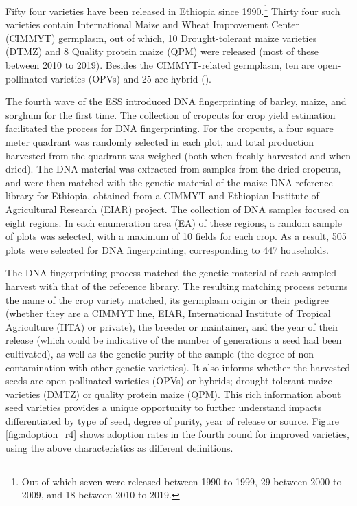 \documentclass[11pt]{article}
\begin{document}
Fifty four varieties have been released in Ethiopia since 1990.\footnote{Out of which seven were released between 1990 to 1999, 29 between 2000 to 2009, and 18 between 2010 to 2019.} Thirty four such varieties contain International Maize and Wheat Improvement Center (CIMMYT) germplasm, out of which, 10 Drought-tolerant maize varieties (DTMZ) and 8 Quality protein maize (QPM) were released (most of these between 2010 to 2019). Besides the CIMMYT-related germplasm, ten are open-pollinated varieties (OPVs) and 25 are hybrid (\citealp{kosmowski2020shining}).

The fourth wave of the ESS introduced DNA fingerprinting of barley, maize, and sorghum for the first time. The collection of cropcuts for crop yield estimation facilitated the process for DNA fingerprinting. For the cropcuts, a four square meter quadrant was randomly selected in each plot, and total production harvested from the quadrant was weighed (both when freshly harvested and when dried). The DNA material was extracted from samples from the dried cropcuts, and were then matched with the genetic material of the maize DNA reference library for Ethiopia, obtained from a CIMMYT and Ethiopian Institute of Agricultural Research (EIAR) project. The collection of DNA samples focused on eight regions. In each enumeration area (EA) of these regions, a random sample of plots was selected, with a maximum of 10 fields for each crop. As a result, 505 plots were selected for DNA fingerprinting, corresponding to 447 households. 

The DNA fingerprinting process matched the genetic material of each sampled harvest with that of the reference library. The resulting matching process returns the name of the crop variety matched, its germplasm origin or their pedigree (whether they are a CIMMYT line, EIAR,  International Institute of Tropical Agriculture (IITA) or private), the breeder or maintainer, and the year of their release (which could be indicative of the number of generations a seed had been cultivated), as well as the genetic purity of the sample (the degree of non-contamination with other genetic varieties). It also informs whether the harvested seeds are open-pollinated varieties (OPVs) or hybrids; drought-tolerant maize varieties (DMTZ) or quality protein maize (QPM). This rich information about seed varieties provides a unique opportunity to further understand impacts differentiated by type of seed, degree of purity, year of release or source. Figure \ref{fig:adoption_r4} shows adoption rates in the fourth round for improved varieties, using the above characteristics as different definitions.
\end{document}
